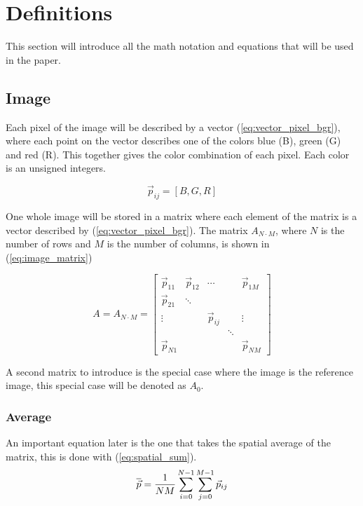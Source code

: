 \section{Definitions}
This section will introduce all the math notation and equations that will be used in the paper. 

\subsection{Image}

Each pixel of the image will be described by a vector (\ref{eq:vector_pixel_bgr}), where each point on the vector describes one of the colors blue (B), green (G) and red (R).  This together gives the color combination of each pixel. Each color is an unsigned integers. 


\begin{equation}
    \label{eq:vector_pixel_bgr}
    \vec{p}_{ij} = [B,G,R]
\end{equation} 

One whole image will be stored in a matrix where each element of the matrix is a vector described by (\ref{eq:vector_pixel_bgr}). The matrix $A_{N\cdot M}$, where $N$ is the number of rows and $M$ is the number of columns, is shown in (\ref{eq:image_matrix})

\begin{equation}
    \label{eq:image_matrix}
    A = A_{N\cdot M} =  
    \begin{bmatrix}
        \vec{p}_{11} & \vec{p}_{12} & \cdots & & \vec{p}_{1M}  \\
        \vec{p}_{21} & \ddots &        &       &                \\
        \vdots       &        &\vec{p}_{ij}&   & \vdots          \\
                     &        &        & \ddots&                  \\
        \vec{p}_{N1} &        &        &       & \vec{p}_{NM}  
    \end{bmatrix}
\end{equation}

A second matrix to introduce is the special case where the image is the reference image, this special case will be denoted as $A_0$.

\subsubsection{Average}

An important equation later is the one that takes the spatial average of the matrix, this is done with (\ref{eq:spatial_sum}).
\begin{equation}
    \label{eq:spatial_sum}
    \overline{\vec{p}} = \frac{1}{NM} \sum_{i=0}^{N-1} \sum_{j=0}^{M-1} \vec{p}_{ij}
\end{equation}


